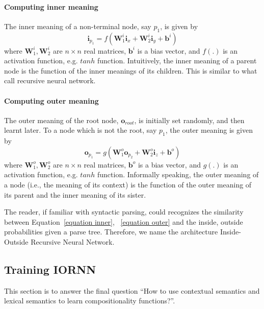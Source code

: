 \documentclass[11pt]{article}
\begin{document}
\paragraph{Computing inner meaning} The inner meaning of a non-terminal node, say $p_1$, is given by
\begin{equation}
	\mathbf{i}_{p_1} = f(\mathbf{W}_1^i \mathbf{i}_{x} + \mathbf{W}_2^i \mathbf{i}_{y} + \mathbf{b}^i)
	\label{equation inner}
\end{equation}
where $\mathbf{W}_1^i, \mathbf{W}_2^i$ are $n \times n$ real matrices, 
$\mathbf{b}^i$ is a bias vector, and $f(.)$ is an activation function, e.g. $tanh$ 
function. Intuitively, the inner meaning of a parent node is the function of the inner meanings 
of its children. This is similar to what \cite{socher_learning_2010} call recursive neural network.

\paragraph{Computing outer meaning} The outer meaning of the root node, $\mathbf{o}_{root}$, is initially 
set randomly, and then learnt later. To a node which is not the root, say $p_1$, the outer meaning is given by
\begin{equation}
	\mathbf{o}_{p_1} = g(\mathbf{W}_1^o \mathbf{o}_{p_2} + \mathbf{W}_2^o \mathbf{i}_{z} + \mathbf{b}^o)
	\label{equation outer}
\end{equation}
where $\mathbf{W}_1^o, \mathbf{W}_2^o$ are $n \times n$ real matrices, 
$\mathbf{b}^o$ is a bias vector, and $g(.)$ is an activation function, e.g. $tanh$ 
function. Informally speaking, the outer meaning of a node (i.e., the meaning of 
its context) is the function of the outer meaning of its parent and the inner meaning 
of its sister. 

The reader, if familiar with syntactic parsing, could recognizes the similarity between 
Equation~\ref{equation inner}, ~\ref{equation outer}
and the inside, outside probabilities given a parse tree.
Therefore, we name the architecture Inside-Outside Recursive Neural Network.


\subsection{Training IORNN}
\label{subsection train iornn}

This section is to answer the final question ``How to use contextual semantics and 
lexical semantics to learn compositionality functions?''. 
\end{document}
